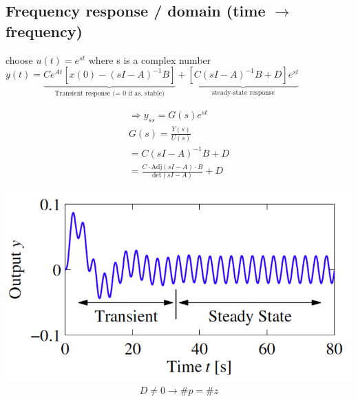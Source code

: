 \subsection{Frequency response / domain (time $\rightarrow$ frequency)}
choose $u(t) = e^{st}$ where s is a complex number\\
$ y(t) = \underbrace{Ce^{At} [x(0) - (sI - A)^{-1} B]}_{\text{Transient response (= 0 if as. stable)}}
+ \underbrace{[C(sI - A)^{-1} B + D]e^{st}}_{\text{steady-state response}}$\\
\begin{minipage}{0.39\linewidth}
    \begin{align*}
        \Rightarrow y_{ss} = G(s) e^{st}\\
    G(s) = \frac{Y(s)}{U(s)}\\
    = C(sI - A)^{-1} B + D\\
    = \frac{C \cdot \text{Adj}(sI - A) \cdot B}{\text{det}(sI - A)} + D
    \end{align*}
\end{minipage}
\begin{minipage}{0.59\linewidth}
    \includegraphics[width = \linewidth]{src/images/transient_steady_state.png}
    \begin{align*}
        D \neq 0 \rightarrow \# p = \# z
    \end{align*}
\end{minipage}


